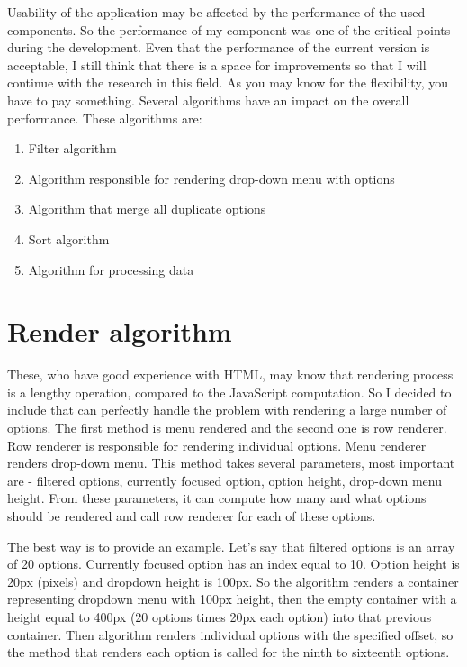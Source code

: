 Usability of the application may be affected by the performance of the used components. So the performance of my component was one of the critical points during the development. Even that the performance of the current version is acceptable, I still think that there is a space for improvements so that I will continue with the research in this field. As you may know for the flexibility, you have to pay something. Several algorithms have an impact on the overall performance. These algorithms are:

\begin{enumerate}
\item Filter algorithm
\item Algorithm responsible for rendering drop-down menu with options
\item Algorithm that merge all duplicate options
\item Sort algorithm
\item Algorithm for processing data
\end{enumerate}

\section{Render algorithm}

These, who have good experience with HTML, may know that rendering process is a lengthy operation, compared to the JavaScript computation. So I decided to include \cite{react-virtualized-select} that can perfectly handle the problem with rendering a large number of options. The first method is menu rendered and the second one is row renderer. Row renderer is responsible for rendering individual options. Menu renderer renders drop-down menu. This method takes several parameters, most important are - filtered options, currently focused option, option height, drop-down menu height. From these parameters, it can compute how many and what options should be rendered and call row renderer for each of these options. 

The best way is to provide an example. Let's say that filtered options is an array of 20 options. Currently focused option has an index equal to 10. Option height is 20px (pixels) and dropdown height is 100px. So the algorithm renders a container representing dropdown menu with 100px height, then the empty container with a height equal to 400px (20 options times 20px each option) into that previous container. Then algorithm renders individual options with the specified offset, so the method that renders each option is called for the ninth to sixteenth options.


